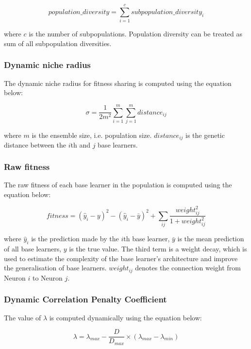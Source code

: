 \documentclass{article}
\begin{document}
\begin{equation}
    \label{equation:neat_ncl_population_diversity}
    population\_diversity = \sum_{i = 1}^c subpopulation\_diversity_{i}
\end{equation}

where $c$ is the number of subpopulations. Population diversity can be treated as sum of all subpopulation diversities. 


\subsubsection{Dynamic niche radius}
The dynamic niche radius for fitness sharing is computed using the equation below: 

\begin{equation}
    \label{equation:neat_ncl_niche_radius}
    \sigma = \frac{1}{2 m^2} \sum_{i = 1}^{m} \sum_{j = 1}^{m} distance_{ij}
\end{equation}

where $m$ is the ensemble size, i.e. population size. $distance_{ij}$ is the genetic distance between the $i$th and $j$ base learners. 


\subsubsection{Raw fitness}
The raw fitness of each base learner in the population is computed using the equation below: 

\begin{equation}
    \label{equation:neat_ncl_raw_fitness}
    fitness = (\hat{y}_i - y)^2 - (\hat{y}_i - \bar{y})^2 + \sum_{ij} \frac{weight_{ij}^2}{1 + weight_{ij}^2}
\end{equation}

where $\hat{y}_i$ is the prediction made by the $i$th base learner, $\bar{y}$ is the mean prediction of all base learners, $y$ is the true value. The third term is a weight decay, which is used to estimate the complexity of the base learner's architecture and improve the generalisation of base learners. $weight_{ij}$ denotes the connection weight from Neuron $i$ to Neuron $j$. 


\subsubsection{Dynamic Correlation Penalty Coefficient}
The value of $\lambda$ is computed dynamically using the equation below: 

\begin{equation}
    \label{equation:neat_ncl_dynamic_lambda}
    \lambda = \lambda_{max} - \frac{D}{D_{max}} \times (\lambda_{max} - \lambda_{min})
\end{equation}
\end{document}
